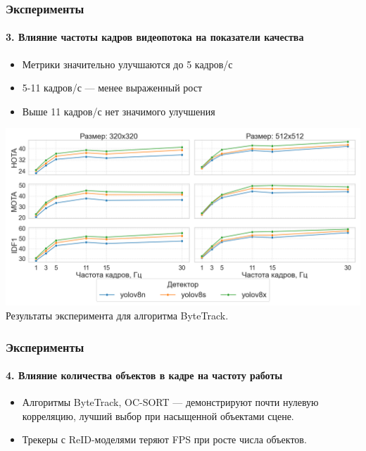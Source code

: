 \documentclass{beamer} %
\begin{document}
\begin{frame}
  \frametitle{Эксперименты}
  \framesubtitle{3. Влияние частоты кадров видеопотока на показатели качества}
  \begin{itemize}
    \item Метрики значительно улучшаются до 5 кадров/с
    \item 5-11 кадров/с — менее выраженный рост
    \item Выше 11 кадров/с нет значимого улучшения
  \end{itemize}
  \centering
  \includegraphics[width=0.7\linewidth]{images/plots/fps_vs_metric/ByteTrack.png}\\
  \small Результаты эксперимента для алгоритма ByteTrack.
\end{frame}

\begin{frame}
  \frametitle{Эксперименты}
  \framesubtitle{4. Влияние количества объектов в кадре на частоту работы}
  
  \begin{itemize}
    \item Алгоритмы ByteTrack, OC-SORT — демонстрируют почти нулевую корреляцию, лучший выбор при насыщенной объектами сцене.
    \item Трекеры с ReID-моделями теряют FPS при росте числа объектов.
  \end{itemize}

\end{frame}
\end{document}
